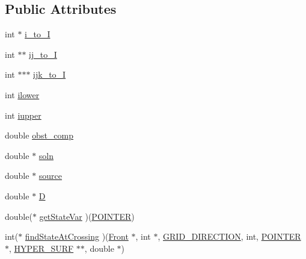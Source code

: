 \subsection*{Public Attributes}
\begin{DoxyCompactItemize}
\item 
int $\ast$ \hyperlink{class_d_u_a_l___e_l_l_i_p_t_i_c___s_o_l_v_e_r_afdd4a98623f46ae45d7e50979977334f}{i\+\_\+to\+\_\+I}
\item 
int $\ast$$\ast$ \hyperlink{class_d_u_a_l___e_l_l_i_p_t_i_c___s_o_l_v_e_r_aa78cd4f05f48d0fd191ffda00818d9ca}{ij\+\_\+to\+\_\+I}
\item 
int $\ast$$\ast$$\ast$ \hyperlink{class_d_u_a_l___e_l_l_i_p_t_i_c___s_o_l_v_e_r_aec704912cd1699b7bdc6c39c9bcb5bb4}{ijk\+\_\+to\+\_\+I}
\item 
int \hyperlink{class_d_u_a_l___e_l_l_i_p_t_i_c___s_o_l_v_e_r_a551654bdb25dbf17b09ff7bae149d9f4}{ilower}
\item 
int \hyperlink{class_d_u_a_l___e_l_l_i_p_t_i_c___s_o_l_v_e_r_ad47e0c3569a46b01a96ca076e2237530}{iupper}
\item 
double \hyperlink{class_d_u_a_l___e_l_l_i_p_t_i_c___s_o_l_v_e_r_adcbff58b7b9fec4de3221de4432c2c8f}{obst\+\_\+comp}
\item 
double $\ast$ \hyperlink{class_d_u_a_l___e_l_l_i_p_t_i_c___s_o_l_v_e_r_ab3ebabe6f5e175663822836a63ca32b8}{soln}
\item 
double $\ast$ \hyperlink{class_d_u_a_l___e_l_l_i_p_t_i_c___s_o_l_v_e_r_a17e1d162f2a626babc280614fa8a8a01}{source}
\item 
double $\ast$ \hyperlink{class_d_u_a_l___e_l_l_i_p_t_i_c___s_o_l_v_e_r_aa86014d1a317246473e56c68a5a5cc4f}{D}
\item 
double($\ast$ \hyperlink{class_d_u_a_l___e_l_l_i_p_t_i_c___s_o_l_v_e_r_a8027bbe3442b5dfa15e1881232b34675}{get\+State\+Var} )(\hyperlink{cdecs_8h_ae51a81000f343b8ec43bca1f6a723d7b}{P\+O\+I\+N\+T\+ER})
\item 
int($\ast$ \hyperlink{class_d_u_a_l___e_l_l_i_p_t_i_c___s_o_l_v_e_r_a07adeb521e1be848a675ffdb11133c3a}{find\+State\+At\+Crossing} )(\hyperlink{fdecs_8h_ac32202b798f848095c489cfd04c4ca5f}{Front} $\ast$, int $\ast$, \hyperlink{int_8h_aa7cc507beba6455174c0996f89fdc8c3}{G\+R\+I\+D\+\_\+\+D\+I\+R\+E\+C\+T\+I\+ON}, int, \hyperlink{cdecs_8h_ae51a81000f343b8ec43bca1f6a723d7b}{P\+O\+I\+N\+T\+ER} $\ast$, \hyperlink{int_8h_acef50fa4757ce0d3f75c97fab5a175bc}{H\+Y\+P\+E\+R\+\_\+\+S\+U\+RF} $\ast$$\ast$, double $\ast$)
\end{DoxyCompactItemize}



